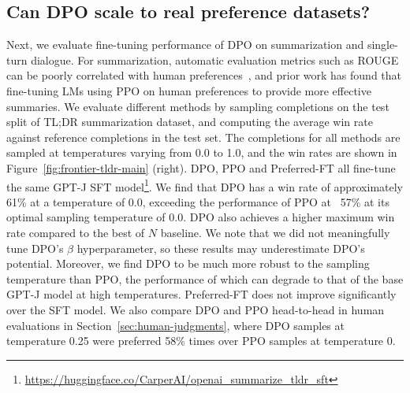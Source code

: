 \documentclass{article}
\begin{document}
\subsection{Can DPO scale to real preference datasets?}
\label{sec:dpo-real-datasets}
Next, we evaluate fine-tuning performance of DPO on summarization and single-turn dialogue. For summarization, 
automatic evaluation metrics such as ROUGE can be poorly correlated with human preferences~\citep{stiennon2022learning}, and prior work has found that fine-tuning LMs using PPO on human preferences to provide more effective summaries. We evaluate different methods by sampling completions on the test split of TL;DR summarization dataset, and computing the average win rate against reference completions in the test set. The completions for all methods are sampled at temperatures varying from 0.0 to 1.0, and the win rates are shown in Figure~\ref{fig:frontier-tldr-main} (right). DPO, PPO and Preferred-FT all fine-tune the same GPT-J SFT model\footnote{\url{https://huggingface.co/CarperAI/openai_summarize_tldr_sft}}. We find that DPO has a win rate of approximately 61\% at a temperature of 0.0, exceeding the performance of PPO at ~57\% at its optimal sampling temperature of 0.0. DPO also achieves a higher maximum win rate compared to the best of $N$ baseline. We note that we did not meaningfully tune DPO's $\beta$ hyperparameter, so these results may underestimate DPO's potential. Moreover, we find DPO to be much more robust to the sampling temperature than PPO, the performance of which can degrade to that of the base GPT-J model at high temperatures. Preferred-FT does not improve significantly over the SFT model. We also compare DPO and PPO head-to-head in human evaluations in Section~\ref{sec:human-judgments}, where DPO samples at temperature 0.25 were preferred 58\% times over PPO samples at temperature 0.
\end{document}
